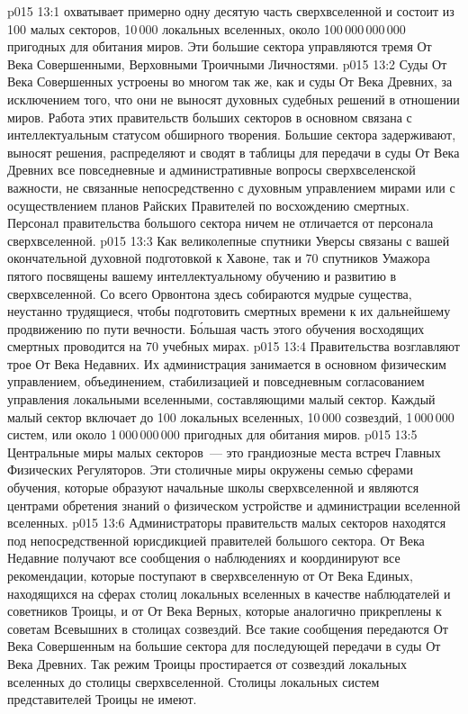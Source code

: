 \vs p015 13:1  охватывает примерно одну десятую часть сверхвселенной и состоит из 100 малых секторов, 10\,000 локальных вселенных, около 100\,000\,000\,000 пригодных для обитания миров. Эти большие сектора управляются тремя От Века Совершенными, Верховными Троичными Личностями.
\vs p015 13:2 Суды От Века Совершенных устроены во многом так же, как и суды От Века Древних, за исключением того, что они не выносят духовных судебных решений в отношении миров. Работа этих правительств больших секторов в основном связана с интеллектуальным статусом обширного творения. Большие сектора задерживают, выносят решения, распределяют и сводят в таблицы для передачи в суды От Века Древних все повседневные и административные вопросы сверхвселенской важности, не связанные непосредственно с духовным управлением мирами или с осуществлением планов Райских Правителей по восхождению смертных. Персонал правительства большого сектора ничем не отличается от персонала сверхвселенной.
\vs p015 13:3 Как великолепные спутники Уверсы связаны с вашей окончательной духовной подготовкой к Хавоне, так и 70 спутников Умажора пятого посвящены вашему интеллектуальному обучению и развитию в сверхвселенной. Со всего Орвонтона здесь собираются мудрые существа, неустанно трудящиеся, чтобы подготовить смертных времени к их дальнейшему продвижению по пути вечности. Б\'ольшая часть этого обучения восходящих смертных проводится на 70 учебных мирах.
\vs p015 13:4 \pc Правительства  возглавляют трое От Века Недавних. Их администрация занимается в основном физическим управлением, объединением, стабилизацией и повседневным согласованием управления локальными вселенными, составляющими малый сектор. Каждый малый сектор включает до 100 локальных вселенных, 10\,000 созвездий, 1\,000\,000 систем, или около 1\,000\,000\,000 пригодных для обитания миров.
\vs p015 13:5 Центральные миры малых секторов~--- это грандиозные места встреч Главных Физических Регуляторов. Эти столичные миры окружены семью сферами обучения, которые образуют начальные школы сверхвселенной и являются центрами обретения знаний о физическом устройстве и администрации вселенной вселенных.
\vs p015 13:6 Администраторы правительств малых секторов находятся под непосредственной юрисдикцией правителей большого сектора. От Века Недавние получают все сообщения о наблюдениях и координируют все рекомендации, которые поступают в сверхвселенную от От Века Единых, находящихся на сферах столиц локальных вселенных в качестве наблюдателей и советников Троицы, и от От Века Верных, которые аналогично прикреплены к советам Всевышних в столицах созвездий. Все такие сообщения передаются От Века Совершенным на большие сектора для последующей передачи в суды От Века Древних. Так режим Троицы простирается от созвездий локальных вселенных до столицы сверхвселенной. Столицы локальных систем представителей Троицы не имеют.
